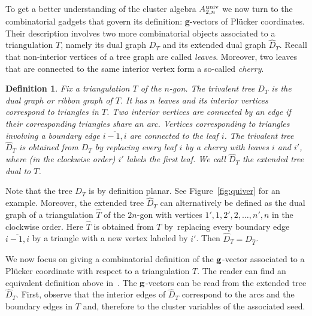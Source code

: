 \documentclass[pdftex]{sigma}%
\newtheorem{Definition}[Theorem]{Definition}
\numberwithin{equation}{section}
\begin{document}
To get a better understanding of the cluster algebra $A_{2,n}^{\rm univ}$ we now turn to the combinatorial gadgets that govern its definition: {\bf g}-vectors of Pl\"ucker coordinates.
Their description involves two more combinatorial objects associated to a triangulation $T$, namely its dual graph $D_T$ and its extended dual graph $\widehat D_T$.
Recall that non-interior vertices of a tree graph are called {\it leaves}.
Moreover, two leaves that are connected to the same interior vertex form a so-called {\it cherry}.

\begin{Definition}
Fix a triangulation $T$ of the $n$-gon. The trivalent tree $D_T$ is the {\it dual graph} or {\it ribbon graph} of $T$. It has $n$ leaves and its interior vertices correspond to triangles in $T$.
 Two interior vertices are connected by an edge if their corresponding triangles share an arc. Vertices corresponding to triangles involving a boundary edge $\overline{i-1,i}$ are connected to the leaf $i$.
 The trivalent tree $\widehat D_T$
 is obtained from $D_T$ by replacing every leaf $i$ by a cherry with leaves $i$ and $i'$, where (in the clockwise order) $i'$ labels the first leaf.
 We call $\widehat D_T$ the {\it extended tree dual to $T$}.
\end{Definition}
Note that the tree $D_T$ is by definition planar. See Figure~\ref{fig:quiver} for an example.
Moreover, the extended tree $\widehat D_T$ can alternatively be defined as the dual graph of a triangulation $\widehat T$ of the $2n$-gon with vertices $1',1,2',2,\dots,n',n$ in the clockwise order.
Here $\widehat T$ is obtained from $T$ by~replacing every boundary edge $\overline{i-1,i}$ by a triangle with a new vertex labeled by $i'$.
Then $\widehat{D}_T=D_{\widehat{T}}$.


We now focus on giving a combinatorial definition of the ${\bf g}$-vector associated to a Pl\"ucker coordinate with respect to a triangulation $T$.
The reader can find an equivalent definition above in~. The ${\bf g}$-vectors can be read from the extended tree $\widehat D_T$.
First, observe that the interior edges of $\widehat D_T$ correspond to the arcs and the boundary edges in $T$ and, therefore to the cluster variables of the associated seed.

\medskip
\end{document}
